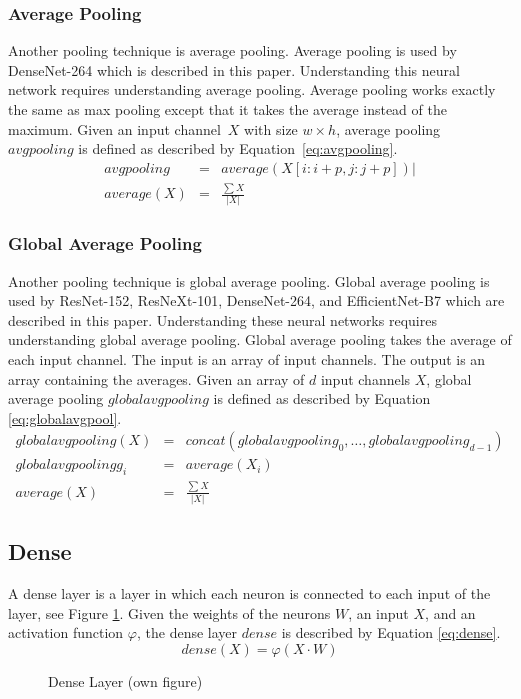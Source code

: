 \subsubsection{Average Pooling}
Another pooling technique is average pooling. 
%
Average pooling is used by DenseNet-264\autocite{Huang.2017} which is described in this paper. 
%
Understanding this neural network requires understanding average pooling. Average pooling works exactly the same as max pooling except that it takes the average instead of the maximum. Given an input channel~$X$ with size $w \times h$, average pooling~$avgpooling$ is defined as described by Equation~\eqref{eq:avgpooling}. \autocite{Michelucci.2019}
\begin{equation}
	\label{eq:avgpooling}
	\begin{array}{lcl}
		avgpooling & = & average(X[i:i+p, j:j+p]) |\\
		average(X) & = & \frac{\sum X}{|X|} 
	\end{array}
\end{equation}
\subsubsection{Global Average Pooling}
Another pooling technique is global average pooling. 
%
Global average pooling is used by ResNet-152\autocite{He.2016}, ResNeXt-101\autocite{Xie.2017}, DenseNet-264\autocite{Huang.2017}, and EfficientNet-B7\autocite{Tan.2019} which are described in this paper.
%
Understanding these neural networks requires understanding global average pooling. Global average pooling takes the average of each input channel. The input is an array of input channels. The output is an array containing the averages. Given an array of $d$ input channels $X$, global average pooling $globalavgpooling$ is defined as described by Equation \eqref{eq:globalavgpool}. \autocite{Lin.2013}
\begin{equation}
	\label{eq:globalavgpool}
	\begin{array}{lcl}
		globalavgpooling(X) & = & concat(globalavgpooling_0, \dots, globalavgpooling_{d-1})\\
		globalavgpoolingg_i & = & average(X_i)\\
		average(X) & = & \frac{\sum X}{|X|} 
	\end{array}
\end{equation}
 

\subsection{Dense}
A dense layer is a layer in which each neuron is connected to each input of the layer, see Figure \ref{fig:dense}. Given the weights of the neurons $W$, an input $X$, and an activation function $\varphi$, the dense layer $dense$ is described by Equation \eqref{eq:dense}. \autocite{Singh.2020}
\begin{equation}
	\label{eq:dense}
	dense(X) = \varphi(X \cdot W)
\end{equation}
\begin{figure}[H]
	\centering
	
	\caption{Dense Layer (own figure)}
	\label{fig:dense}
\end{figure}


